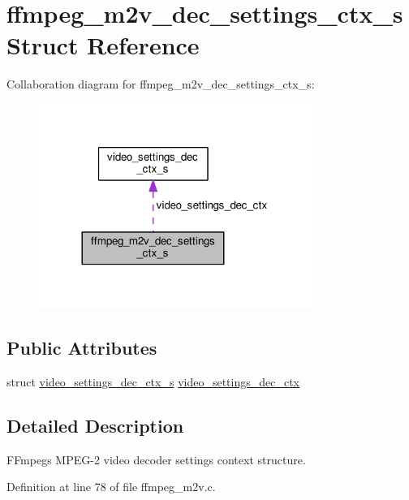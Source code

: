 \hypertarget{structffmpeg__m2v__dec__settings__ctx__s}{}\section{ffmpeg\+\_\+m2v\+\_\+dec\+\_\+settings\+\_\+ctx\+\_\+s Struct Reference}
\label{structffmpeg__m2v__dec__settings__ctx__s}


Collaboration diagram for ffmpeg\+\_\+m2v\+\_\+dec\+\_\+settings\+\_\+ctx\+\_\+s\+:\nopagebreak
\begin{figure}[H]
\begin{center}
\leavevmode
\includegraphics[width=252pt]{structffmpeg__m2v__dec__settings__ctx__s__coll__graph}
\end{center}
\end{figure}
\subsection*{Public Attributes}
\begin{DoxyCompactItemize}
\item 
struct \hyperlink{structvideo__settings__dec__ctx__s}{video\+\_\+settings\+\_\+dec\+\_\+ctx\+\_\+s} \hyperlink{structffmpeg__m2v__dec__settings__ctx__s_afb6928fa62b6cb4a3d49b5d65452aaa7}{video\+\_\+settings\+\_\+dec\+\_\+ctx}
\end{DoxyCompactItemize}


\subsection{Detailed Description}
F\+Fmpeg\textquotesingle{}s M\+P\+E\+G-\/2 video decoder settings context structure. 

Definition at line 78 of file ffmpeg\+\_\+m2v.\+c.



